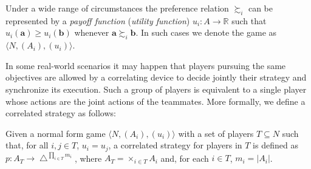 Under a wide range of circumstances the preference relation $\succsim_{i}$ can be represented by a \textit{payoff function} (\textit{utility function}) $u_{i}:A\rightarrow\mathbb{R}$ such that $u_{i}(\mathbf{a})\geq u_{i}(\mathbf{b})$ whenever $\mathbf{a}\succsim_{i}\mathbf{b}$. In such cases we denote the game as $\langle N,(A_{i}),(u_{i})\rangle$.



In some real-world scenarios it may happen that players pursuing the same objectives are allowed by a correlating device to decide jointly their strategy and synchronize its execution. Such a group of players is equivalent to a single player whose actions are the joint actions of the teammates. More formally, we define a correlated strategy as follows:
\begin{definition}\label{def:correlated_strategy}
	Given a normal form game $\langle N,(A_{i}),(u_{i})\rangle$ with a set of players $T\subseteq N$ such that, for all $i,j \in T$, $u_{i}=u_{j}$, a correlated strategy for players in $T$ is defined as $p:A_{T}\rightarrow \bigtriangleup^{\prod_{i \in T}m_{i}}$, where $A_{T}=\times_{i\in T}A_{i}$ and, for each $i\in T$, $m_{i}=|A_{i}|$.
\end{definition}


